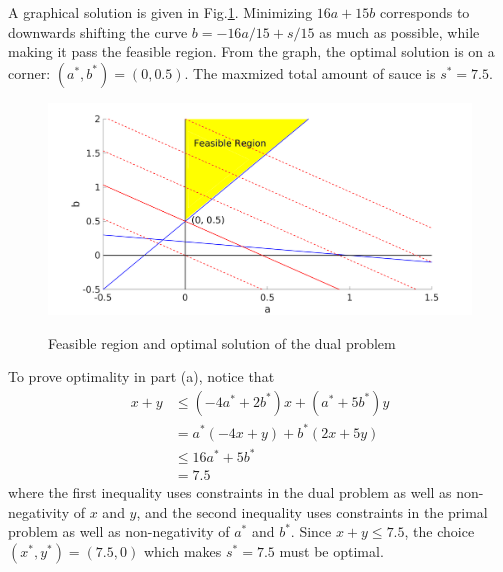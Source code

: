 \documentclass{article}
\begin{document}
A graphical solution is given in Fig.\ref{dual}. Minimizing $16a+15b$ corresponds to downwards shifting the curve $b=-16a/15+s/15$ as much as possible, while making it pass the feasible region. From the graph, the optimal solution is on a corner: $(a^*,b^*)=(0,0.5)$. The maxmized total amount of sauce is $s^*=7.5$.
\begin{figure}[!htbp]
\centering
\includegraphics[width=12cm]{problem2b.png}\\
\caption{Feasible region and optimal solution of the dual problem}\label{dual}
\end{figure}

To prove optimality in part (a), notice that
\begin{align*}
x+y&\leqslant(-4a^*+2b^*)x+(a^*+5b^*)y\\
&=a^*(-4x+y)+b^*(2x+5y)\\
&\leqslant16a^*+5b^*\\
&=7.5
\end{align*}
where the first inequality uses constraints in the dual problem as well as non-negativity of $x$ and $y$, and the second inequality uses constraints in the primal problem as well as non-negativity of $a^*$ and $b^*$. Since $x+y\leqslant7.5$, the choice $(x^*,y^*)=(7.5,0)$ which makes $s^*=7.5$ must be optimal.
\end{document}
